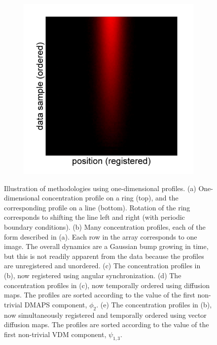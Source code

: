 \documentclass{pnastwo}
\begin{document}
\begin{figure}
\begin{subfigure}{0.2\textwidth}
\caption{}
\label{subfig:1d_aligned_ordered}
\end{subfigure}
\begin{subfigure}{0.2\textwidth}
\includegraphics[width=\textwidth]{registered_ordered_vdm_toy}
\caption{}
\label{subfig:1d_aligned_ordered_vdm}
\end{subfigure}
\caption{Illustration of methodologies using one-dimensional profiles. (a) One-dimensional concentration profile on a ring (top), and the corresponding profile on a line (bottom). Rotation of the ring corresponds to shifting the line left and right (with periodic boundary conditions). (b) Many concentration profiles, each of the form described in (a). Each row in the array corresponds to one image. The overall dynamics are a Gaussian bump growing in time, but this is not readily apparent from the data because the profiles are unregistered and unordered. (c) The concentration profiles in (b), now registered using angular synchronization. (d) The concentration profiles in (c), now temporally ordered using diffusion maps. The profiles are sorted according to the value of the first non-trivial DMAPS component, $\phi_2$. (e) The concentration profiles in (b), now simultaneously registered and temporally ordered using vector diffusion maps. The profiles are sorted according to the value of the first non-trivial VDM component, $\psi_{1, 3}$.}
\label{fig:1d_demo}
\end{figure}
\end{document}
